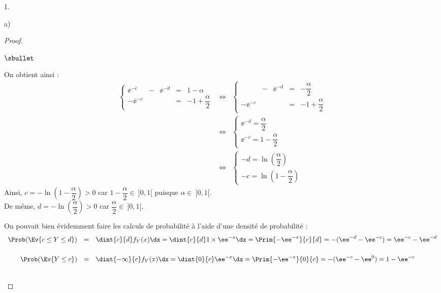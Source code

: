 \documentclass[11pt]{article}%
\begin{document}
\begin{noliste}{1.}
\begin{noliste}{a)}
\begin{proof}
\begin{noliste}{$\sbullet$}
      \item On obtient ainsi :
        \[
        \begin{array}{rcl}
          \left\{
            \begin{array}{ccccc}
              \ee^{-c} & - & \ee^{-d} & = & 1 - \alpha \\[.4cm]
              -\ee^{-c} & & & = & -1 + \dfrac{\alpha}{2}
            \end{array}
          \right. %
          & \Leftrightarrow &
          \left\{
            \begin{array}{ccccc}
              & - & \ee^{-d} & = & - \dfrac{\alpha}{2} \\[.4cm]
              - \ee^{-c} & & & = & -1 + \dfrac{\alpha}{2}
            \end{array}
          \right. \\[1cm]
          & \Leftrightarrow &
          \left\{
            \begin{array}{l}
              \ee^{-d} = \dfrac{\alpha}{2} \\[.4cm]
              \ee^{-c} = 1 - \dfrac{\alpha}{2}
            \end{array}
          \right. \\[1cm]
          & \Leftrightarrow &
          \left\{
            \begin{array}{l}
              -d = \ln\left( \dfrac{\alpha}{2} \right) \\[.4cm]
              -c = \ln\left(1 - \dfrac{\alpha}{2} \right)
            \end{array}
          \right.
        \end{array}
        \]
        Ainsi, $c = -\ln\left(1 - \dfrac{\alpha}{2} \right) > 0$ car
        $1 - \dfrac{\alpha}{2} \in \ ]0,1[$ puisque $\alpha \in \
        ]0,1[$.\\[.2cm]
        De même, $d = - \ln\left( \dfrac{\alpha}{2} \right) > 0$ car
        $\dfrac{\alpha}{2} \in \ ]0,1[$.
      \end{noliste}
      \conc{$c = -\ln\left(1 - \dfrac{\alpha}{2} \right)$ \quad et
        \quad $d = - \ln\left( \dfrac{\alpha}{2} \right)$}
      \begin{remarkL}{0.99}%
        On pouvait bien évidemment faire les calculs de probabilité à
        l'aide d'une densité de probabilité :
        \[
        \begin{array}{rcl}
          \Prob(\Ev{c\leq Y\leq d}) & = & \dint{c}{d} f_Y(x) \dx =
          \dint{c}{d} 1 \times \ee^{-x} \dx = \Prim{-\ee^{-x}}{c}{d} = -
          (\ee^{-d} - \ee^{-c}) = \ee^{-c} - \ee^{-d}
          \\[.6cm]
          \Prob(\Ev{Y \leq c}) & = & \dint{-\infty}{c} f_Y(x) \dx =
          \dint{0}{c} \ee^{-x} \dx = \Prim{-\ee^{-x}}{0}{c} = -(\ee^{-c}
          - \ee^{0}) = 1 - \ee^{-c}
        \end{array}
        \]
      \end{remarkL}~\\[-1.4cm]
    \end{proof}



\end{noliste}
\end{noliste}
\end{document}
